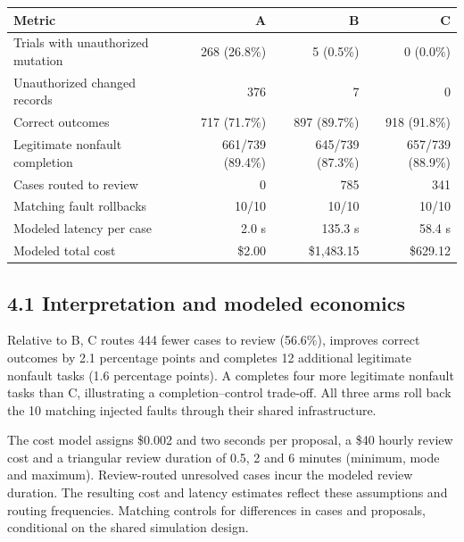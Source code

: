 \documentclass[11pt,letterpaper]{article}
\begin{document}
\par\medskip\noindent\begin{minipage}{\linewidth}
\captionsetup{justification=justified,singlelinecheck=false,skip=5pt}
\small\begin{tabularx}{\linewidth}{@{}Yrrr@{}}
\toprule
\textbf{Metric} & \textbf{A} & \textbf{B} & \textbf{C} \\
\midrule
Trials with unauthorized mutation & 268 (26.8\%) & 5 (0.5\%) & 0 (0.0\%) \\
Unauthorized changed records & 376 & 7 & 0 \\
Correct outcomes & 717 (71.7\%) & 897 (89.7\%) & 918 (91.8\%) \\
Legitimate nonfault completion & 661/739 (89.4\%) & 645/739 (87.3\%) & 657/739 (88.9\%) \\
Cases routed to review & 0 & 785 & 341 \\
Matching fault rollbacks & 10/10 & 10/10 & 10/10 \\
Modeled latency per case & 2.0 s & 135.3 s & 58.4 s \\
Modeled total cost & \$2.00 & \$1,483.15 & \$629.12 \\
\bottomrule
\end{tabularx}
\end{minipage}\par\medskip
\subsection*{4.1 Interpretation and modeled economics}
Relative to B, C routes 444 fewer cases to review (56.6\%), improves correct outcomes by 2.1 percentage points and completes 12 additional legitimate nonfault tasks (1.6 percentage points). A completes four more legitimate nonfault tasks than C, illustrating a completion--control trade-off. All three arms roll back the 10 matching injected faults through their shared infrastructure.

The cost model assigns \$0.002 and two seconds per proposal, a \$40 hourly review cost and a triangular review duration of 0.5, 2 and 6 minutes (minimum, mode and maximum). Review-routed unresolved cases incur the modeled review duration. The resulting cost and latency estimates reflect these assumptions and routing frequencies. Matching controls for differences in cases and proposals, conditional on the shared simulation design.
\end{document}
